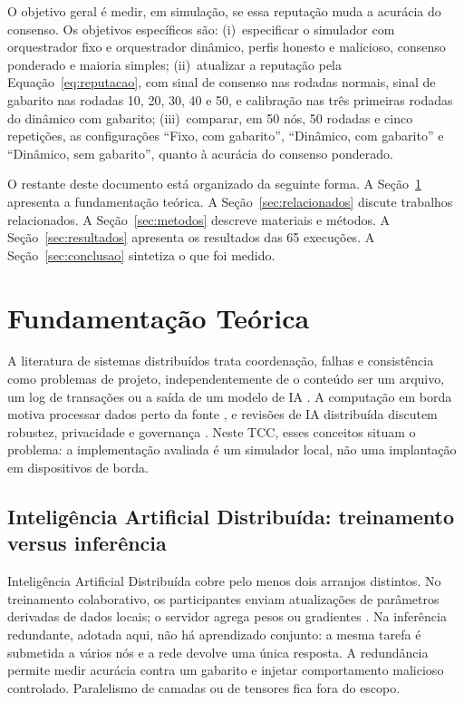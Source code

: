 \documentclass[12pt]{article}
\begin{document}
O objetivo geral é medir, em simulação, se essa reputação muda a acurácia do consenso. Os objetivos específicos são: (i)~especificar o simulador com orquestrador fixo e orquestrador dinâmico, perfis honesto e malicioso, consenso ponderado e maioria simples; (ii)~atualizar a reputação pela Equação~\ref{eq:reputacao}, com sinal de consenso nas rodadas normais, sinal de gabarito nas rodadas 10, 20, 30, 40 e 50, e calibração nas três primeiras rodadas do dinâmico com gabarito; (iii)~comparar, em 50 nós, 50 rodadas e cinco repetições, as configurações ``Fixo, com gabarito'', ``Dinâmico, com gabarito'' e ``Dinâmico, sem gabarito'', quanto à acurácia do consenso ponderado.

O restante deste documento está organizado da seguinte forma. A Seção~\ref{sec:fundamentacao} apresenta a fundamentação teórica. A Seção~\ref{sec:relacionados} discute trabalhos relacionados. A Seção~\ref{sec:metodos} descreve materiais e métodos. A Seção~\ref{sec:resultados} apresenta os resultados das 65 execuções. A Seção~\ref{sec:conclusao} sintetiza o que foi medido.

\section{Fundamentação Teórica}
\label{sec:fundamentacao}

A literatura de sistemas distribuídos trata coordenação, falhas e consistência como problemas de projeto, independentemente de o conteúdo ser um arquivo, um log de transações ou a saída de um modelo de IA \cite{tanenbaum2017,coulouris2021}. A computação em borda motiva processar dados perto da fonte \cite{shi2016}, e revisões de IA distribuída discutem robustez, privacidade e governança \cite{wei2025,wang2025}. Neste TCC, esses conceitos situam o problema: a implementação avaliada é um simulador local, não uma implantação em dispositivos de borda.

\subsection{Inteligência Artificial Distribuída: treinamento versus inferência}

Inteligência Artificial Distribuída cobre pelo menos dois arranjos distintos. No treinamento colaborativo, os participantes enviam atualizações de parâmetros derivadas de dados locais; o servidor agrega pesos ou gradientes \cite{mcmahan2017,bonawitz2019,kairouz2021}. Na inferência redundante, adotada aqui, não há aprendizado conjunto: a mesma tarefa é submetida a vários nós e a rede devolve uma única resposta. A redundância permite medir acurácia contra um gabarito e injetar comportamento malicioso controlado. Paralelismo de camadas ou de tensores fica fora do escopo.
\end{document}
